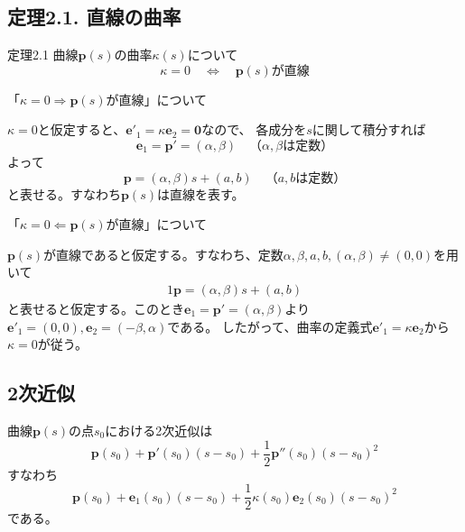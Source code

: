\documentclass[a4j,disablejfam,dvipdfmx,papersize,slide,uplatex,21pt]{jsarticle}
\makeatletter
\renewenvironment{proof}[1][\proofname]{\par
        \pushQED{\qed}
        \normalfont
        \topsep6\p@\@plus6\p@ \trivlist
        \item[\hskip\labelsep{\bfseries #1}\@addpunct{\bfseries}]\ignorespaces
    }{%
        \popQED\endtrivlist\@endpefalse
    }
\renewcommand{\proofname}{証明.}
\makeatother
\begin{document}
\newpage
\subsection*{定理2.1. 直線の曲率}
\begin{itembox}[l]{定理2.1}
    曲線$\bm{p}(s)$の曲率$\kappa(s)$について
    \begin{equation}
        \kappa = 0 \quad \Longleftrightarrow \quad \text{$\bm{p}(s)$が直線}
    \end{equation}
\end{itembox}

\newpage
\begin{proof}
    「$\kappa = 0 \Rightarrow \text{$\bm{p}(s)$が直線}$」について

    $\kappa = 0$と仮定すると、$\bm{e}'_1 = \kappa \bm{e}_2 = \bm{0}$なので、
    各成分を$s$に関して積分すれば
    \begin{equation}
        \bm{e}_1 = \bm{p}' = (\alpha, \beta) \quad \text{（$\alpha, \beta$は定数）}
    \end{equation}
    よって
    \begin{equation}
        \bm{p} = (\alpha, \beta) s + (a, b) \quad \text{（$a, b$は定数）}
    \end{equation}
    と表せる。すなわち$\bm{p}(s)$は直線を表す。

    \newpage

    「$\kappa = 0 \Leftarrow \text{$\bm{p}(s)$が直線}$」について

    $\bm{p}(s)$が直線であると仮定する。すなわち、定数$\alpha, \beta, a, b, (\alpha, \beta) \neq (0, 0)$を用いて
    \begin{alignat}{1}
        \bm{p} = (\alpha, \beta) s + (a, b)
    \end{alignat}
    と表せると仮定する。このとき$\bm{e}_1 = \bm{p}' = (\alpha, \beta)$より
    $\bm{e}'_1 = (0, 0), \bm{e}_2 = (-\beta, \alpha)$である。
    したがって、曲率の定義式$\bm{e}'_1 = \kappa \bm{e}_2$から
    $\kappa = 0$が従う。
\end{proof}

\newpage
\subsection*{2次近似}
曲線$\bm{p}(s)$の点$s_0$における2次近似は
\begin{equation}
    \bm{p}(s_0) + \bm{p}'(s_0) (s - s_0) + \frac{1}{2} \bm{p}''(s_0) (s - s_0)^2
\end{equation}
すなわち
\begin{equation}
    \bm{p}(s_0) + \bm{e}_1(s_0) (s - s_0) + \frac{1}{2} \kappa(s_0) \bm{e}_2(s_0) (s - s_0)^2
\end{equation}
である。
\end{document}
